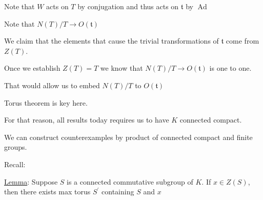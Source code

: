 \documentclass{article}
\theoremstyle{definition}
\begin{document}
Note that \(W\) acts on \(T\) by conjugation and thus acts on \(\mathfrak{t}\) by \(\operatorname{Ad}\)  

Note that \(N(T) / T \to O(\mathfrak{t})\) 

We claim that the elements that cause the trivial transformations of \(\mathfrak{t}\) come from \(Z(T)\).

Once we establish \(Z(T)=T\) we know that \(N(T) / T \to O(\mathfrak{t})\) is one to one.

That would allow us to embed \(N(T) / T\) to \(O(\mathfrak{t})\) 

Torus theorem is key here.

For that reason, all results today requires us to have \(K\) connected compact.

We can construct counterexamples by product of connected compact and finite groups.

Recall:

\underline{Lemma}: Suppose \(S\) is a connected commutative subgroup of \(K\). If \(x\in Z(S)\), then there exists max torus \(S^{\prime}\) containing \(S\) and \(x\) 
\end{document}
